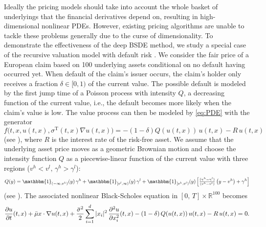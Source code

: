 \documentclass[11pt,english]{article}
\providecommand{\R}{{\ensuremath{\mathbb{R}}}}
\begin{document}
Ideally the pricing models should take into account
the whole basket of underlyings that the financial derivatives depend on,
resulting in high-dimensional nonlinear PDEs.
 However, existing pricing algorithms are unable to tackle
these problems generally due to the curse of dimensionality. 
To demonstrate the effectiveness of the deep BSDE method, we study
a special case of the recursive valuation model with default risk \cite{Duffie1996,Bender2017}. 
We consider the fair price of a European claim based on 100 underlying assets
 conditional on no default having occurred yet. 
When default of the claim's issuer occurs, the claim's holder only receives a fraction $\delta \in [0, 1)$ of the current value.
The possible default is modeled by the first jump time of a Poisson process with intensity $Q$, a decreasing function of the current value, i.e., the default becomes more likely when the claim's value is low. 
The value process can then be modeled by \eqref{eq:PDE} with the generator 
\begin{equation}
  f\big( t, x, u(t,x), \sigma^{\operatorname{T}}( t, x ) \nabla u( t, x ) \big)
  = 
  - \left( 1 - \delta \right) Q( u(t,x) ) \, u(t,x) 
  - R \, u(t,x)
\end{equation}
(see \cite{Duffie1996}), where $R$ is the interest rate of the risk-free asset. 
We assume that the underlying asset price moves as a geometric Brownian motion and choose 
the intensity function $Q$ as a piecewise-linear function of the current value with 
three regions ($v^h<v^l,\,\gamma^h>\gamma^l$):
\begin{equation}
  Q(y) = 
    \mathbbm{1}_{ ( - \infty, v^h) }(y)\,\gamma^h
    +
    \mathbbm{1}_{[ v^l, \infty )}( y )\,\gamma^l
    +
    \mathbbm{1}_{[ v^h, v^l )}(y )
    \left[
      \tfrac{ ( \gamma^h - \gamma^l ) }{ ( v^h - v^l ) }\left( y - v^h \right)+\gamma^h
    \right]
\end{equation}
(see \cite{Bender2017}).
The associated nonlinear Black-Scholes equation in $[0,\,T]\times\R^{100}$ becomes
\begin{equation}
  \label{eq:PDE_defaultrisk}
   \frac{ \partial u}{ \partial t } ( t, x )
  +
 \bar{\mu}x\cdot \nabla u(t,x)
  +
  \frac{ \bar{\sigma}^2 }{ 2 }\sum_{ i = 1 }^d| x_i |^2\,
\frac{ \partial^2 u}{ \partial x^2_i } (t,x)\\
- \left( 1 - \delta \right) Q( u(t,x) ) \, u(t,x) - R \, u(t,x)= 0.
\end{equation}
\end{document}
